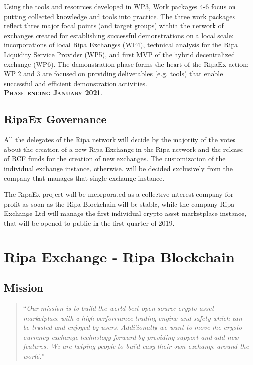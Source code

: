 \documentclass[11pt,fleqn,oneside]{book} %
\begin{document}
\begin{center}
\begin{tcolorbox}[roadmapBox,
		title=\textbf{\textsc{Development of hybrid-decentralized exchange (WP 4-6)}}]
		Using the tools and resources developed in WP3, 
		Work packages 4-6 focus on putting collected knowledge and tools into practice. The three work packages reflect three major
		focal points (and target groups) within the network of exchanges created for establishing successful 
		demonstrations on a local scale: incorporations of local Ripa Exchanges (WP4), technical analysis for the 
		Ripa Liquidity Service Provider (WP5), and first MVP of the hybrid decentralized exchange (WP6). The demonstration
		phase forms the heart of the RipaEx action; WP 2 and 3 are focused on providing
		deliverables (e.g. tools) that enable successful and efficient demonstration activities.\\
		\vspace{1cm}
		\centering\textbf{\textsc{Phase ending January 2021}}.
	\end{tcolorbox}
\end{center}

\section{RipaEx Governance}
All the delegates of the Ripa network will decide by the majority of the votes about the creation of a new Ripa Exchange in the 
Ripa network and the release of RCF funds for the creation of new exchanges.
The customization of the individual exchange instance, otherwise, will be decided exclusively from the company that manages that 
single exchange instance.

The RipaEx project will be incorporated as a collective interest company for profit as soon as the Ripa Blockchain will be stable, 
while the company Ripa Exchange Ltd will manage the first individual crypto asset marketplace instance, that will be opened 
to public in the first quarter of 2019.



\chapter{Ripa Exchange - Ripa Blockchain}

\section{Mission}
\begin{quotation}
	``\textit{Our mission is to build the world best open source crypto asset marketplace with a high performance trading engine 
	and safety which can be trusted and enjoyed by users. Additionally we want to move the crypto currency exchange technology 
	forward by providing support and add new features. We are helping people to build easy their own exchange around the world.}''
\end{quotation}
\end{document}
